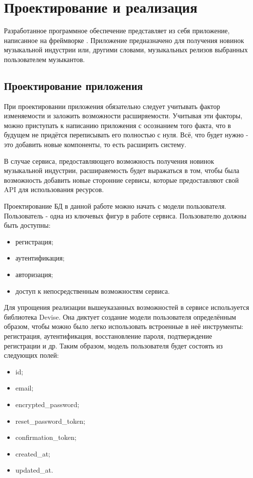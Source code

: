 \section{Проектирование и реализация} %
\label{sec:arch_and_realization}


Разработанное программное обеспечение представляет из себя приложение, написанное на фреймворке \ror.
Приложение предназначено для получения новинок музыкальной индустрии или, другими словами, музыкальных релизов выбранных пользователем музыкантов.

\subsection{Проектирование приложения}
\label{sub:arch_and_mod:design}
При проектировании приложения обязательно следует учитывать фактор изменяемости и заложить возможности расширяемости. Учитывая эти факторы, можно приступать к написанию приложения с осознанием того факта, что в будущем не придётся переписывать его полностью с нуля. Всё, что будет нужно - это добавить новые компоненты, то есть расширить систему.

В случае сервиса, предоставляющего возможность получения новинок музыкальной индустрии, расшираяемость будет выражаться в том, чтобы была возможность добавить новые сторонние сервисы, которые предоставляют свой API для использования ресурсов.

Проектирование БД в данной работе можно начать с модели пользователя. Пользователь - одна из ключевых фигур в работе сервиса. Пользователю должны быть доступны:

\begin{itemize}
  \item регистрация;
  \item аутентификация;
  \item авторизация;
  \item доступ к непосредственным возможностям сервиса.
\end{itemize}

Для упрощения реализации вышеуказанных возможностей в сервисе используется библиотека Devise. Она диктует создание модели пользователя определённым образом, чтобы можно было легко использовать встроенные в неё инструменты: регистрация, аутентификация, восстановление пароля, подтверждение регистрации и др. Таким образом, модель пользователя будет состоять из следующих полей:

\begin{itemize}
  \item id;
  \item email;
  \item encrypted\_password;
  \item reset\_password\_token;
  \item confirmation\_token;
  \item created\_at;
  \item updated\_at.
\end{itemize}

